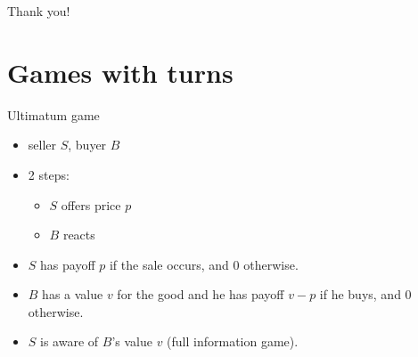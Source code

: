 \documentclass{beamer}
\begin{document}
\begin{frame}
  \begin{center}
    Thank you!
  \end{center}
\end{frame}

\appendix
\section*{Games with turns}

\begin{frame}{Ultimatum game}
  \pause
  \begin{itemize}
    \item seller $S$, buyer $B$
      \pause
    \item 2 steps:
      \begin{itemize}
        \item $S$ offers price $p$
        \item $B$ reacts
      \end{itemize}
      \pause
    \item $S$ has payoff $p$ if the sale occurs, and $0$ otherwise.
      \pause
    \item $B$ has a value $v$ for the good and he has payoff $v-p$ if he buys,
      and $0$ otherwise.
      \pause
    \item $S$ is aware of $B$'s value $v$ (full information game).
  \end{itemize}
\end{frame}
%
%
%
\end{document}
